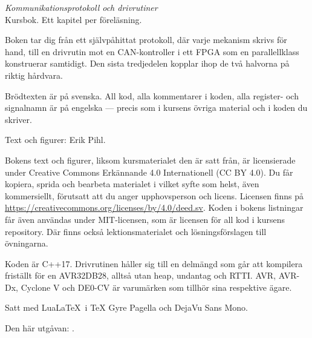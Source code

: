 \thispagestyle{empty}
\vspace*{\fill}
{\small
\noindent\textit{Kommunikationsprotokoll och drivrutiner}\\
Kursbok. Ett kapitel per föreläsning.

\medskip
\noindent Boken tar dig från ett självpåhittat protokoll, där varje mekanism skrivs för hand, till
en drivrutin mot en CAN-kontroller i ett FPGA som en parallellklass konstruerar samtidigt. Den
sista tredjedelen kopplar ihop de två halvorna på riktig hårdvara.

\medskip
\noindent Brödtexten är på svenska. All kod, alla kommentarer i koden, alla register- och
signalnamn är på engelska --- precis som i kursens övriga material och i koden du skriver.

\medskip
\noindent Text och figurer: Erik Pihl.

\medskip
\noindent Bokens text och figurer, liksom kursmaterialet den är satt från, är licensierade under
Creative Commons Erkännande 4.0 Internationell (CC BY 4.0). Du får kopiera, sprida och bearbeta
materialet i vilket syfte som helst, även kommersiellt, förutsatt att du anger upphovsperson och
licens. Licensen finns på \url{https://creativecommons.org/licenses/by/4.0/deed.sv}.
\medskip
\noindent Koden i bokens listningar får även användas under MIT-licensen, som är licensen för all
kod i kursens repository. Där finns också lektionsmaterialet och lösningsförslagen till övningarna.

\medskip
\noindent Koden är C++17. Drivrutinen håller sig till en delmängd som går att kompilera
friställt för en AVR32DB28, alltså utan heap, undantag och RTTI. AVR, AVR-Dx, Cyclone V och
DE0-CV är varumärken som tillhör sina respektive ägare.

\medskip
\noindent Satt med Lua\LaTeX\ i TeX Gyre Pagella och DejaVu Sans Mono.

\medskip
\noindent\textcolor{muted}{Den här utgåvan: \bookedition.}
\par}
\cleardoublepage
